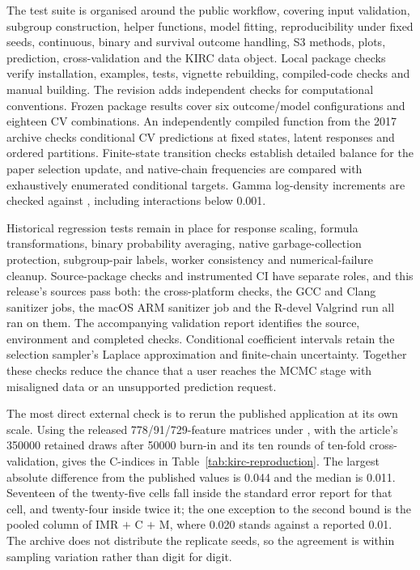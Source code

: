 \documentclass[article]{jss}
\begin{document}
The test suite is organised around the public workflow, covering input
validation, subgroup construction, helper functions, model fitting,
reproducibility under fixed seeds, continuous, binary and survival outcome handling,
S3 methods, plots, prediction, cross-validation and
the KIRC data object.
Local package checks verify installation, examples, tests, vignette rebuilding,
compiled-code checks and manual building.
The revision adds independent checks for computational conventions. Frozen
package results cover six outcome/model configurations and eighteen CV
combinations. An independently compiled function from the 2017 archive checks
conditional CV predictions at fixed states, latent responses and ordered
partitions. Finite-state transition checks establish detailed balance for the
paper selection update, and native-chain frequencies are compared with
exhaustively enumerated conditional targets. Gamma log-density increments are
checked against , including interactions below 0.001.

Historical regression tests remain in place for response scaling, formula
transformations, binary probability averaging, native garbage-collection
protection, subgroup-pair labels, worker consistency and numerical-failure
cleanup. Source-package checks and instrumented CI have separate roles, and
this release's sources pass both: the cross-platform  checks,
the GCC and Clang sanitizer jobs, the macOS ARM sanitizer job and the R-devel
Valgrind run all ran on them. The accompanying validation report identifies the
source, environment and completed checks. Conditional coefficient intervals retain the selection sampler's
Laplace approximation and finite-chain uncertainty. Together these checks
reduce the chance that a user reaches the MCMC stage with misaligned data or an
unsupported prediction request.

The most direct external check is to rerun the published application at its own
scale. Using the released 778/91/729-feature matrices under
, with the article's 350000 retained draws after
50000 burn-in and its ten rounds of ten-fold cross-validation, gives the
C-indices in Table~\ref{tab:kirc-reproduction}. The largest absolute
difference from the published values is 0.044 and the median is 0.011.
Seventeen of the twenty-five cells fall inside the standard error
\citet{chekouo2017} report for that cell, and twenty-four inside twice it; the
one exception to the second bound is the pooled column of IMR $+$ C $+$ M,
where 0.020 stands against a reported 0.01. The archive does not distribute the
replicate seeds, so the agreement is within sampling variation rather than
digit for digit.
\end{document}
